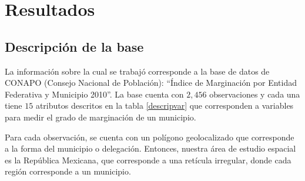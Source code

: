 
\chapter{Resultados}

\section{Descripción de la base}
  
La información sobre la cual se trabajó corresponde a la base de datos de CONAPO (Consejo Nacional de Población): ``Índice de Marginación por Entidad Federativa y Municipio 2010''. La base cuenta con $2,456$ observaciones y cada una tiene $15$ atributos descritos en la tabla \ref{descripvar} que corresponden a variables para medir el grado de marginación de un municipio.  

Para cada observación, se cuenta con un polígono geolocalizado que corresponde a la forma del municipio o delegación. Entonces, nuestra área de estudio espacial es la República Mexicana, que  corresponde a una retícula irregular, donde cada región corresponde a un municipio.

